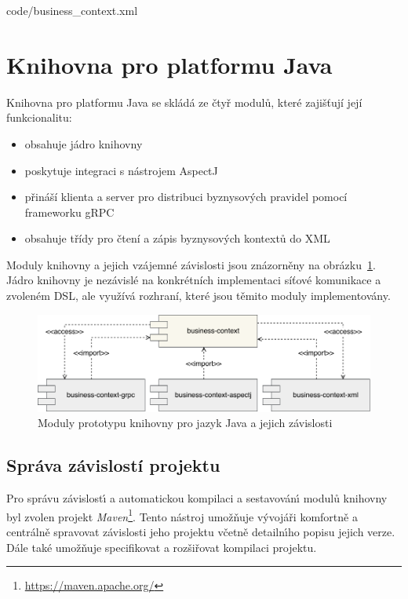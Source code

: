 
{code/business_context.xml}

\section{Knihovna pro platformu Java}

Knihovna pro platformu Java se skládá ze čtyř modulů, které zajišťují
její funkcionalitu:

\begin{itemize}
    \item {} obsahuje jádro knihovny
    \item {} poskytuje integraci s nástrojem AspectJ
    \item {} přináší klienta a server pro distribuci byznysových pravidel pomocí frameworku gRPC
    \item {} obsahuje třídy pro čtení a zápis byznysových kontextů do \gls{XML}
\end{itemize}

Moduly knihovny a jejich vzájemné závislosti jsou znázorněny na obrázku~\ref{fig:modules}.
Jádro knihovny je nezávislé na konkrétních implementaci síťové komunikace a zvoleném
\gls{DSL}, ale využívá rozhraní, které jsou těmito moduly implementovány.

\begin{figure}
    \centering
    \includegraphics[keepaspectratio=true, width=1\linewidth]{figures/library-modules.pdf}
    \caption{Moduly prototypu knihovny pro jazyk Java a jejich závislosti}
    \label{fig:modules}
\end{figure}

\subsection{Správa závislostí projektu}

Pro správu závislost\'{\i} a automatickou kompilaci a sestavován\'{\i} modulů knihovny byl zvolen
projekt \textit{Maven}\footnote{\url{https://maven.apache.org/}}.
Tento nástroj umožňuje v\'yvojáři komfortně a centrálně spravovat závislosti jeho projektu včetně
detailn\'{\i}ho popisu jejich verze. Dále také umožňuje specifikovat a rozšiřovat kompilaci projektu.

